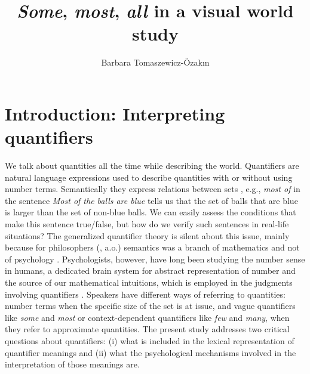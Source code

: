\documentclass[output=paper]{langscibook}
\author{Barbara Tomaszewicz-Özakın\affiliation{University of Cologne}}
\title{\textit{Some}, \textit{most}, \textit{all} in a visual world study}
\begin{document}
\maketitle

\section{Introduction: Interpreting quantifiers} 

We talk about quantities all the time while describing the world. Quantifiers are natural language expressions used to
describe quantities with or without using number terms. Semantically they express relations between sets \citep{barwise1981generalized}, e.g., \textit{most of }in the sentence \textit{Most of the balls are blue} tells us that the set of
balls that are blue is larger than the set of non-blue balls. We can easily assess the conditions that make this
sentence true/false, but how do we verify such sentences in real-life situations? The generalized quantifier theory
\citep{mostowski1960generalization, perlindstrom1966first,montague1973proper} is silent about this issue, mainly because for philosophers (\citealt{montague1973proper}, a.o.) semantics was a branch of mathematics and not of psychology \citep{partee2011formal}. Psychologists, however, have long been
studying the number sense in humans, a dedicated brain system for abstract representation of number and the source of
our mathematical intuitions, which is employed in the judgments involving quantifiers \citep{feigenson2004core,mcmillan2005neural,mcmillan2006quantifier,clark2007number,dehaene2009origins,dehaene2011number,troiani2009logical}. Speakers have different ways of referring to quantities:
number terms when the specific size of the set is at issue, and vague quantifiers like \textit{some} and \textit{most}
or context-dependent quantifiers like \textit{few} and \textit{many}, when they refer to approximate quantities. The
present study addresses two critical questions about quantifiers: (i) what is included in the lexical representation of quantifier meanings
and (ii) what the psychological mechanisms involved in the interpretation of those meanings are.
\end{document}
